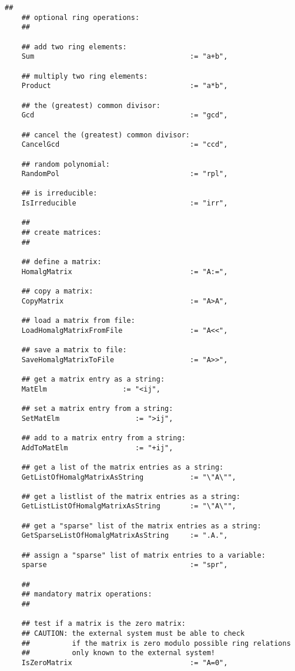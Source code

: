 \documentclass[a4paper,11pt]{report}
\begin{document}
{{{\begin{Verbatim}[fontsize=\small,frame=single,label=Code]
    ##
    ## optional ring operations:
    ##
    
    ## add two ring elements:
    Sum                                     := "a+b",
    
    ## multiply two ring elements:
    Product                                 := "a*b",
    
    ## the (greatest) common divisor:
    Gcd                                     := "gcd",
    
    ## cancel the (greatest) common divisor:
    CancelGcd                               := "ccd",
    
    ## random polynomial:
    RandomPol                               := "rpl",
    
    ## is irreducible:
    IsIrreducible                           := "irr",
    
    ##
    ## create matrices:
    ##
    
    ## define a matrix:
    HomalgMatrix                            := "A:=",
    
    ## copy a matrix:
    CopyMatrix                              := "A>A",
    
    ## load a matrix from file:
    LoadHomalgMatrixFromFile                := "A<<",
    
    ## save a matrix to file:
    SaveHomalgMatrixToFile                  := "A>>",
    
    ## get a matrix entry as a string:
    MatElm                  := "<ij",
    
    ## set a matrix entry from a string:
    SetMatElm                  := ">ij",
    
    ## add to a matrix entry from a string:
    AddToMatElm                := "+ij",
    
    ## get a list of the matrix entries as a string:
    GetListOfHomalgMatrixAsString           := "\"A\"",
    
    ## get a listlist of the matrix entries as a string:
    GetListListOfHomalgMatrixAsString       := "\"A\"",
    
    ## get a "sparse" list of the matrix entries as a string:
    GetSparseListOfHomalgMatrixAsString     := ".A.",
    
    ## assign a "sparse" list of matrix entries to a variable:
    sparse                                  := "spr",
    
    ##
    ## mandatory matrix operations:
    ##
    
    ## test if a matrix is the zero matrix:
    ## CAUTION: the external system must be able to check
    ##          if the matrix is zero modulo possible ring relations
    ##          only known to the external system!
    IsZeroMatrix                            := "A=0",
    

\end{Verbatim}}}}
\end{document}
